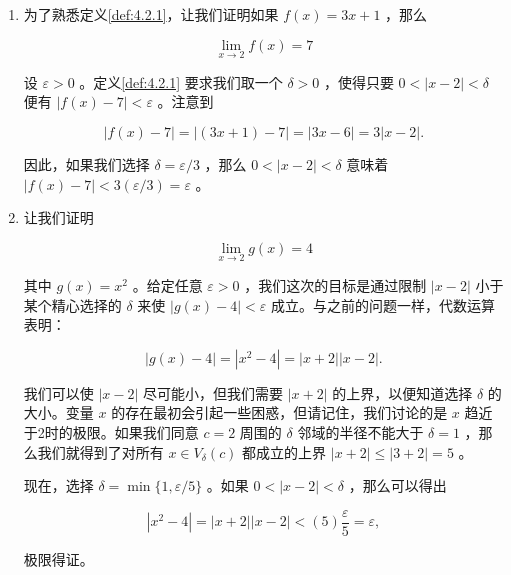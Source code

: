 \begin{Eg}
  \label{eg:4.2.2}
  \begin{enumerate}[label = (\roman*)]
  \item\label{item:4.2.1}为了熟悉定义\ref{def:4.2.1}，让我们证明如果 \(f\left( x\right)  = {3x} + 1\) ，那么

\[
\mathop{\lim }\limits_{{x \rightarrow  2}}f\left( x\right)  = 7
\]

设 \(\varepsilon  > 0\) 。定义\ref{def:4.2.1} 要求我们取一个 \(\delta  > 0\) ，使得只要 \(0 < \left| {x - 2}\right|  < \delta\) 便有 \(\left| {f\left( x\right)  - 7}\right|  < \varepsilon\) 。注意到

\[
\left| {f\left( x\right)  - 7}\right|  = \left| {\left( {{3x} + 1}\right)  - 7}\right|  = \left| {{3x} - 6}\right|  = 3\left| {x - 2}\right| .
\]

因此，如果我们选择 \(\delta  = \varepsilon /3\) ，那么 \(0 < \left| {x - 2}\right|  < \delta\) 意味着 \(\left| {f\left( x\right)  - 7}\right|  < 3\left( {\varepsilon /3}\right)  = \varepsilon\) 。
  \item\label{item:4.2.2}让我们证明

\[
\mathop{\lim }\limits_{{x \rightarrow  2}}g\left( x\right)  = 4
\]

其中 \(g\left( x\right)  = {x}^{2}\) 。给定任意 \(\varepsilon  > 0\) ，我们这次的目标是通过限制 \(\left| {x - 2}\right|\) 小于某个精心选择的 \(\delta\) 来使 \(\left| {g\left( x\right)  - 4}\right|  < \varepsilon\) 成立。与之前的问题一样，代数运算表明：

\[
\left| {g\left( x\right)  - 4}\right|  = \left| {{x}^{2} - 4}\right|  = \left| {x + 2}\right| \left| {x - 2}\right| .
\]

我们可以使 \(\left| {x - 2}\right|\) 尽可能小，但我们需要 \(\left| {x + 2}\right|\) 的上界，以便知道选择 \(\delta\) 的大小。变量 \(x\) 的存在最初会引起一些困惑，但请记住，我们讨论的是 \(x\) 趋近于2时的极限。如果我们同意 \(c = 2\) 周围的 \(\delta\) 邻域的半径不能大于 \(\delta  = 1\) ，那么我们就得到了对所有 \(x \in  {V}_{\delta }\left( c\right)\) 都成立的上界 \(\left| {x + 2}\right|  \leq  \left| {3 + 2}\right|  = 5\) 。

现在，选择 \(\delta  = \min \{ 1,\varepsilon /5\}\) 。如果 \(0 < \left| {x - 2}\right|  < \delta\) ，那么可以得出

\[
\left| {{x}^{2} - 4}\right|  = \left| {x + 2}\right| \left| {x - 2}\right|  < \left( 5\right) \frac{\varepsilon }{5} = \varepsilon ,
\]

极限得证。
  \end{enumerate}
\end{Eg}




